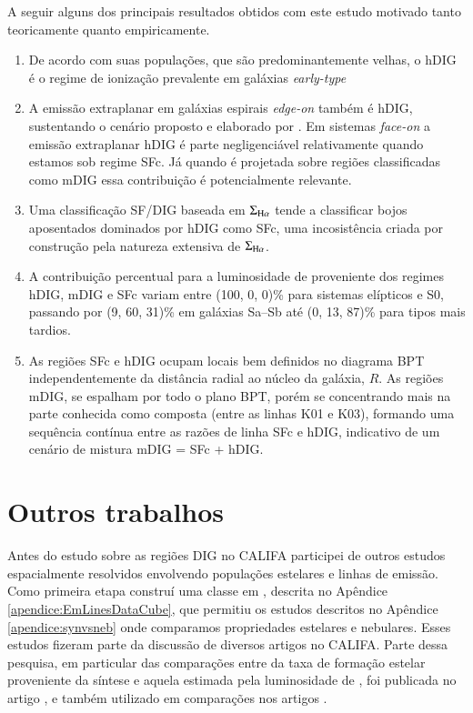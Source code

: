 A seguir alguns dos principais resultados obtidos com este estudo motivado tanto teoricamente quanto empiricamente.

\begin{enumerate}[label=(\roman*)]
  \item De acordo com suas populações, que são predominantemente velhas, o hDIG é o regime de ionização prevalente em galáxias {\em early-type}
  \item A emissão extraplanar em galáxias espirais {\em edge-on} também é hDIG, sustentando o cenário proposto e elaborado por \citet{FloresFajardo.etal.2011a}. Em sistemas {\em face-on} a emissão extraplanar hDIG é parte negligenciável relativamente quando estamos sob regime SFc. Já quando é projetada sobre regiões classificadas como mDIG essa contribuição é potencialmente relevante.
  \item Uma classificação SF/DIG baseada em $\Sigma_{\Ha}$ tende a classificar bojos aposentados dominados por hDIG como SFc, uma incosistência criada por construção pela natureza extensiva de $\Sigma_{\Ha}$.
  \item A contribuição percentual para a luminosidade de \Ha proveniente dos regimes hDIG, mDIG e SFc variam entre (100, 0, 0)\% para sistemas elípticos e S0, passando por (9, 60, 31)\% em galáxias Sa--Sb até (0, 13, 87)\% para tipos mais tardios.
  \item As regiões SFc e hDIG ocupam locais bem definidos no diagrama BPT independentemente da distância radial ao núcleo da galáxia, $R$. As regiões mDIG, se espalham por todo o plano BPT, porém se concentrando mais na parte conhecida como composta (entre as linhas K01 e K03), formando uma sequência contínua entre as razões de linha SFc e hDIG, indicativo de um cenário de mistura mDIG = SFc + hDIG.
\end{enumerate}

\section{Outros trabalhos}
\label{sec:concl:other}

Antes do estudo sobre as regiões DIG no CALIFA participei de outros estudos espacialmente resolvidos envolvendo populações estelares e linhas de emissão. Como primeira etapa construí uma classe em \pyt, descrita no Apêndice \ref{apendice:EmLinesDataCube}, que permitiu os estudos descritos no Apêndice \ref{apendice:synvsneb} onde comparamos propriedades estelares e nebulares. Esses estudos fizeram parte da discussão de diversos artigos no CALIFA. Parte dessa pesquisa, em particular das comparações entre da taxa de formação estelar proveniente da síntese e aquela estimada pela luminosidade de \Ha, foi publicada no artigo \citep{GonzalezDelgado.etal.2016a}, e também utilizado em comparações nos artigos \citet{CortijoFerrero.etal.2017a, CortijoFerrero.etal.2017b, CortijoFerrero.etal.2017c}.

